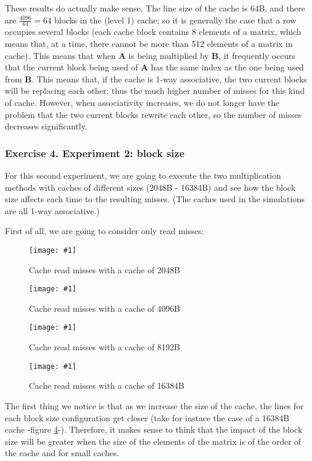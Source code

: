 \documentclass{article}
\newcommand{\myFigure}[4]{%
    \begin{figure}[!ht]
        \texttt{[image: \#1]}
        \centering
        \caption{#2}
        \label{#3}
    \end{figure}
}
\begin{document}
These results do actually make sense. The line size of the cache is 64B, and there are $\frac{4096}{64}=64$ blocks in the 
(level 1) cache; so it is generally the case that a row occupies several blocks (each cache block contains 8 elements of a matrix, which means that, at a time, there cannot be more than 512 elements of a matrix in cache). This means that when $\mathbf{A}$ is being multiplied by $\mathbf{B}$, it frequently occurs that the current block being used of $\mathbf{A}$ has the same index as the one being used from $\mathbf{B}$. This means that, if the cache is 1-way associative, the two current blocks will be replacing each other; thus the much higher number of misses for this kind of cache. However, when associativity increases, we do not longer have the problem that the two current blocks rewrite each other, so the number of misses decreases significantly.


\pagebreak

\subsubsection*{Exercise 4. Experiment 2: block size}


For this second experiment, we are going to execute the two multiplication methods with caches of different sizes (2048B - 16384B) and see how the block size affects each time to the resulting misses. (The caches used in the simulations are all 1-way associative.)

First of all, we are going to consider only read misses:


\myFigure{../material_P3/protect_out4/BlockSize_2048/cache_lectura.png}{Cache read misses with a cache of 2048B}{block_2048_lec}{0.55}


\myFigure{../material_P3/protect_out4/BlockSize_4096/cache_lectura.png}{Cache read misses with a cache of 4096B}{block_4096_lec}{0.55}

\myFigure{../material_P3/protect_out4/BlockSize_8192/cache_lectura.png}{Cache read misses with a cache of 8192B}{block_8192B_lec}{0.55}

\myFigure{../material_P3/protect_out4/BlockSize_16384/cache_lectura.png}{Cache read misses with a cache of 16384B}{block_16384B_lec}{0.55}

\pagebreak 
The first thing we notice is that as we increase the size of the cache, the lines for each block size configuration get closer (take for instace the case of a 16384B cache -figure \ref{block_16384B_lec}-).  Therefore, it makes sense to think that the impact of the block size will be greater when the size of the elements of the matrix is of the order of the cache and for small caches.
\end{document}
